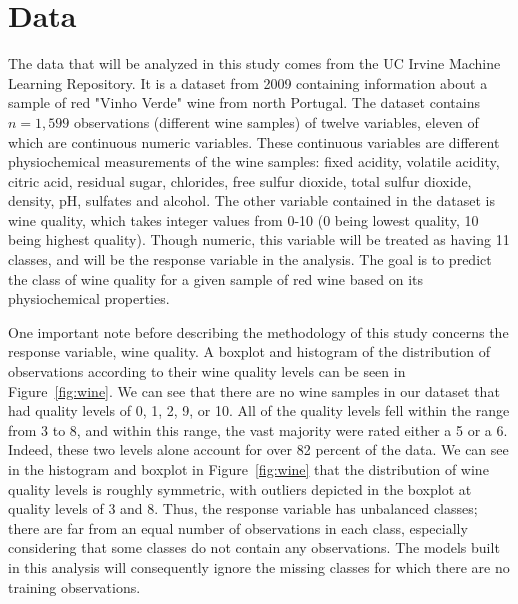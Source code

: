 \documentclass[12pt]{article}
\begin{document}
\section{Data}
\label{sec:data}

The data that will be analyzed in this study comes from the UC Irvine Machine 
Learning Repository.  It is a dataset from 2009 containing information about 
a sample of red "Vinho Verde" wine from north Portugal.  The dataset contains 
$n = 1,599$ observations (different wine samples) of twelve variables, eleven 
of which are continuous numeric variables.  These continuous variables are 
different physiochemical measurements of the wine samples: fixed acidity, 
volatile acidity, citric acid, residual sugar, chlorides, free sulfur dioxide, 
total sulfur dioxide, density, pH, sulfates and alcohol.  The other variable 
contained in the dataset is wine quality, which takes integer values from 0-10 
(0 being lowest quality, 10 being highest quality).  Though numeric, this 
variable will be treated as having 11 classes, and will be the response 
variable in the analysis.  The goal is to predict the class of wine quality 
for a given sample of red wine based on its physiochemical properties.  

One important note before describing the methodology of this study concerns the 
response variable, wine quality.  A boxplot and histogram of the distribution of 
observations according to their wine quality levels can be seen in 
Figure~\ref{fig:wine}.  We can see that there are no wine samples in our dataset 
that had quality levels of 0, 1, 2, 9, or 10.  All of the quality levels fell 
within the range from 3 to 8, and within this range, the vast majority were rated 
either a 5 or a 6.  Indeed, these two levels alone account for over 82 percent of 
the data.  We can see in the histogram and boxplot in Figure~\ref{fig:wine} that 
the distribution of wine quality levels is roughly symmetric, with outliers 
depicted in the boxplot at quality levels of 3 and 8.  Thus, the response variable 
has unbalanced classes; there are far from an equal number of observations in each 
class, especially considering that some classes do not contain any observations.  
The models built in this analysis will consequently ignore the missing classes for 
which there are no training observations.  
\end{document}
